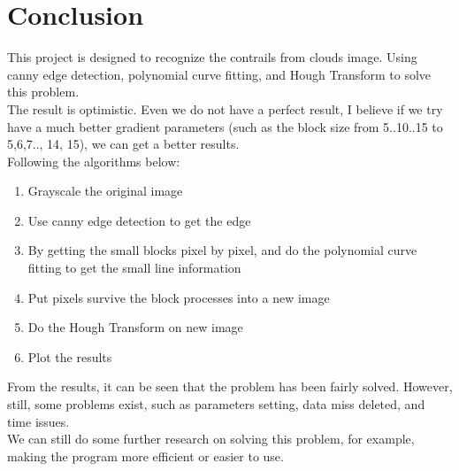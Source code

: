 \chapter{Conclusion}

This project is designed to recognize the contrails from clouds image. Using canny edge detection, polynomial curve fitting, and Hough Transform to solve this problem. \\

The result is optimistic. Even we do not have a perfect result, I believe if we try have a much better gradient parameters (such as the block size from 5..10..15 to 5,6,7.., 14, 15), we can get a better results.\\

Following the algorithms below:
\begin{enumerate}
    \item Grayscale the original image
    \item Use canny edge detection to get the edge
    \item By getting the small blocks pixel by pixel, and do the polynomial curve fitting to get the small line information
    \item Put pixels survive the block processes into a new image
    \item Do the Hough Transform on new image
    \item Plot the results
\end{enumerate}
From the results, it can be seen that the problem has been fairly solved. However, still, some problems exist, such as parameters setting, data miss deleted, and time issues.\\
We can still do some further research on solving this problem, for example, making the program more efficient or easier to use.
